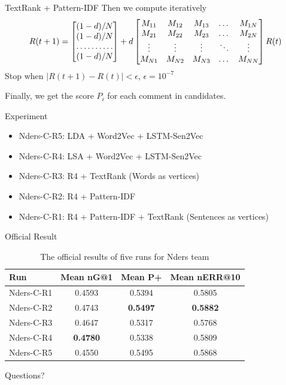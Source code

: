 \documentclass[aspectratio=169]{beamer}
\begin{document}
    \begin{frame}{TextRank + Pattern-IDF}
      Then we compute iteratively
      \[
      R(t+1) = 
      \begin{bmatrix}
          (1-d)/N       \\
          (1-d)/N       \\
          \hdotsfor{1} \\
          (1-d)/N       
      \end{bmatrix}
      +d
      \begin{bmatrix}
          M_{11} & M_{12} & M_{13} & \dots  & M_{1N} \\
          M_{21} & M_{22} & M_{23} & \dots  & M_{2N} \\
          \vdots & \vdots & \vdots & \ddots & \vdots \\
          M_{N1} & M_{N2} & M_{N3} & \dots  & M_{NN}
      \end{bmatrix}
      R(t)
      \]
      Stop when $|R(t+1)-R(t)|<\epsilon$, $\epsilon = 10^{-7}$

      Finally, we get the score $P_i$ for each comment in candidates. 
    \end{frame}

  \begin{frame}{Experiment}
    \begin{itemize}
      \item{Nders-C-R5: } LDA + Word2Vec + LSTM-Sen2Vec 
      \item{Nders-C-R4: } LSA + Word2Vec + LSTM-Sen2Vec 
      \item{Nders-C-R3: } R4 + TextRank (Words as vertices)
      \item{Nders-C-R2: } R4 + Pattern-IDF 
      \item{Nders-C-R1: } R4 + Pattern-IDF + TextRank (Sentences as vertices)
    \end{itemize}
  \end{frame}

  \begin{frame}{Official Result}
    \begin{table}
\centering
\caption{The official results of five runs for Nders team}
\label{tab:commands}
\begin{minipage}{\columnwidth}
\begin{center}
\begin{tabular}{|l|c|c|c|}
\hline
 Run        &  Mean nG@1  &  Mean P+  &  Mean nERR@10  \\ \hline
 Nders-C-R1 & 0.4593 & 0.5394 & 0.5805 \\ \hline
 Nders-C-R2 & 0.4743 & \textbf{0.5497} & \textbf{0.5882} \\ \hline
 Nders-C-R3 & 0.4647 & 0.5317 & 0.5768 \\ \hline
 Nders-C-R4 & \textbf{0.4780} & 0.5338 & 0.5809 \\ \hline
 Nders-C-R5 & 0.4550 & 0.5495 & 0.5868 \\ \hline
\end{tabular}
\end{center}
\end{minipage}
\end{table}
  \end{frame}

  \begin{frame}[standout]
    Questions?
  \end{frame}
\end{document}
